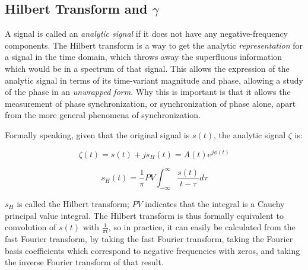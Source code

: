 \documentclass[12pt]{article}
\begin{document}
\subsection{Hilbert Transform and $\gamma$}

A signal is called an \emph{analytic signal} if it does not have any negative-frequency components. The Hilbert transform is a way to get the analytic \emph{representation} for a signal in the time domain, which throws away the superfluous information which would be in a spectrum of that signal\cite{gabor}. This allows the expression of the analytic signal in terms of its time-variant magnitude and phase, allowing a study of the phase in an \emph{unwrapped form}\cite{gabor}. Why this is important is that it allows the measurement of phase synchronization, or synchronization of phase alone, apart from the more general phenomena of synchronization.

Formally speaking, given that the original signal is $s(t)$, the analytic signal $\zeta$ is:

$$\zeta(t) = s(t) + js_H(t) = A(t)e^{j\phi(t)}$$

$$s_H(t) = \frac{1}{\pi} PV \int_{-\infty}^{\infty} \frac{s(t)}{t - \tau} d\tau$$

$s_H$ is called the Hilbert transform; $PV$ indicates that the integral is a Cauchy principal value integral. The Hilbert transform is thus formally equivalent to convolution of $s(t)$ with $\frac{1}{\pi t}$, so in practice, it can easily be calculated from the fast Fourier transform, by taking the fast Fourier transform, taking the Fourier basis coefficients which correspond to negative frequencies with zeros, and taking the inverse Fourier transform of that result.\cite{hilbert}
\end{document}
